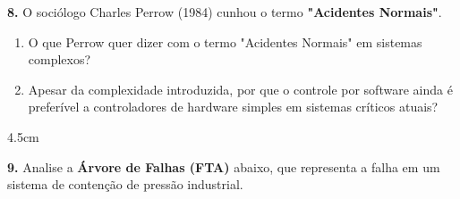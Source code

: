 \documentclass[12pt,a4paper,twoside]{report}
\begin{document}
\vspace{0.5cm}

\textbf{8.} O sociólogo Charles Perrow (1984) cunhou o termo \textbf{"Acidentes Normais"}.

\begin{enumerate}[label=\alph*)]
  \item O que Perrow quer dizer com o termo "Acidentes Normais" em sistemas complexos?
  \item Apesar da complexidade introduzida, por que o controle por software ainda é preferível a controladores de hardware simples em sistemas críticos atuais?
\end{enumerate}
\begin{resposta}{4.5cm}
\end{resposta}

\vspace{0.5cm}

\textbf{9.} Analise a \textbf{Árvore de Falhas (FTA)} abaixo, que representa a falha em um sistema de contenção de pressão industrial.
\end{document}
